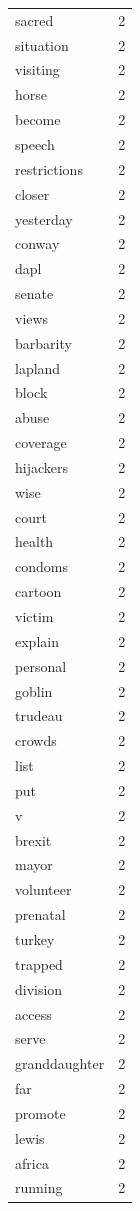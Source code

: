 \begin{tabular}{lr}
sacred & 2 \\
situation & 2 \\
visiting & 2 \\
horse & 2 \\
become & 2 \\
speech & 2 \\
restrictions & 2 \\
closer & 2 \\
yesterday & 2 \\
conway & 2 \\
dapl & 2 \\
senate & 2 \\
views & 2 \\
barbarity & 2 \\
lapland & 2 \\
block & 2 \\
abuse & 2 \\
coverage & 2 \\
hijackers & 2 \\
wise & 2 \\
court & 2 \\
health & 2 \\
condoms & 2 \\
cartoon & 2 \\
victim & 2 \\
explain & 2 \\
personal & 2 \\
goblin & 2 \\
trudeau & 2 \\
crowds & 2 \\
list & 2 \\
put & 2 \\
v & 2 \\
brexit & 2 \\
mayor & 2 \\
volunteer & 2 \\
prenatal & 2 \\
turkey & 2 \\
trapped & 2 \\
division & 2 \\
access & 2 \\
serve & 2 \\
granddaughter & 2 \\
far & 2 \\
promote & 2 \\
lewis & 2 \\
africa & 2 \\
running & 2 \\

\end{tabular}
